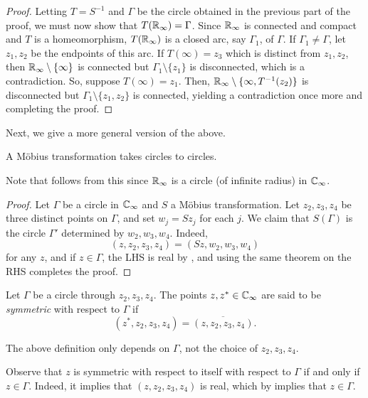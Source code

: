 \begin{proof}
		Letting $T = S^{-1}$ and $\Gamma$ be the circle obtained in the previous part of the proof, we must now show that $T(\mathbb{R}_\infty) = \Gamma$. Since $\mathbb{R}_\infty$ is connected and compact and $T$ is a homeomorphism, $T(\mathbb{R}_\infty)$ is a closed arc, say $\Gamma_1$, of $\Gamma$. If $\Gamma_1 \ne \Gamma$, let $z_1,z_2$ be the endpoints of this arc. If $T(\infty) = z_3$ which is distinct from $z_1,z_2$, then $\mathbb{R}_\infty \setminus \{\infty\}$ is connected but $\Gamma_1 \setminus \{z_1\}$ is disconnected, which is a contradiction. So, suppose $T(\infty) = z_1$. Then, $\mathbb{R}_\infty \setminus \{\infty,T^{-1}(z_2)\}$ is disconnected but $\Gamma_1 \setminus \{z_1,z_2\}$ is connected, yielding a contradiction once more and completing the proof.
	\end{proof}

	Next, we give a more general version of the above.
	
	\begin{ftheo}
		A M\"{o}bius transformation takes circles to circles.
	\end{ftheo}

	Note that  follows from this since $\mathbb{R}_\infty$ is a circle (of infinite radius) in $\mathbb{C}_\infty$.

	\begin{proof}
		Let $\Gamma$ be a circle in $\mathbb{C}_\infty$ and $S$ a M\"{o}bius transformation. Let $z_2,z_3,z_4$ be three distinct points on $\Gamma$, and set $w_j = Sz_j$ for each $j$. We claim that $S(\Gamma)$ is the circle $\Gamma'$ determined by $w_2,w_3,w_4$. Indeed,
		\[ (z,z_2,z_3,z_4) = (Sz,w_2,w_3,w_4) \]
		for any $z$, and if $z \in \Gamma$, the LHS is real by , and using the same theorem on the RHS completes the proof.
	\end{proof}

	\begin{fdef}
		Let $\Gamma$ be a circle through $z_2,z_3,z_4$. The points $z,z^* \in \mathbb{C}_\infty$ are said to be \emph{symmetric} with respect to $\Gamma$ if
		\[ (z^*,z_2,z_3,z_4) = \overline{(z,z_2,z_3,z_4)}. \]
	\end{fdef}

	\begin{remark}
		The above definition only depends on $\Gamma$, not the choice of $z_2,z_3,z_4$.
	\end{remark}


	Observe that $z$ is symmetric with respect to itself with respect to $\Gamma$ if and only if $z \in \Gamma$. Indeed, it implies that $(z,z_2,z_3,z_4)$ is real, which by  implies that $z \in \Gamma$.\\
	
